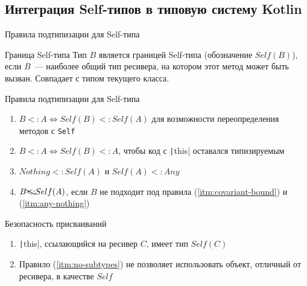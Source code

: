 \documentclass[aspectratio=169,usenames,dvipsnames]{beamer}
\begin{document}
    \subsection{Интеграция Self-типов в типовую систему Kotlin}

    \begin{frame}[fragile]{Правила подтипизации для Self-типа}

        \begin{block}{Граница Self-типа}
            Тип $B$ является границей Self-типа (обозначение \underline{$Self(B)$}), если $B$~--- наиболее общий тип ресивера, на котором этот метод может быть вызван.
            Совпадает с типом текущего класса.
        \end{block}

        \pause

        \begin{block}{Правила подтипизации для Self-типа}
            \begin{enumerate}
                \item \label{itm:covariant-bound} $B <: A \iff Self(B) <: Self(A)$ для возможности переопределения методов с \texttt{Self}
                \item \label{itm:this-subtype} $B <: A \iff Self(B) <: A$, чтобы код с \texttt|this| оставался типизируемым
                \item \label{itm:any-nothing} $Nothing <: Self(A)$ и $Self(A) <: Any$
                \item \label{itm:no-subtypes} $B \bcancel{<:} Self(A)$, если $B$ не подходит под правила (\ref{itm:covariant-bound}) и (\ref{itm:any-nothing})
            \end{enumerate}
        \end{block}

        \pause

        \begin{block}{Безопасность присваиваний}
            \begin{enumerate}
                \item \texttt|this|, ссылающийся на ресивер $C$, имеет тип $Self(C)$
                \item Правило (\ref{itm:no-subtypes}) не позволяет использовать объект, отличный от ресивера, в качестве $Self$
            \end{enumerate}
        \end{block}
    \end{frame}
\end{document}
